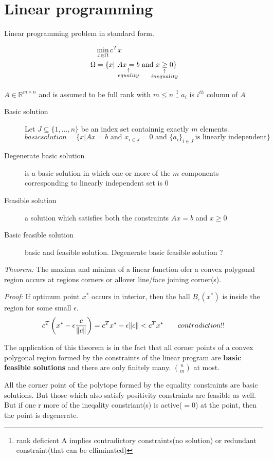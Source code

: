 \def \lpstd#1#2#3#4{
\begin{align*}
&\min\limits_{#1 \in #3} #2
\\
#3& = \{#1|~#4\}
\end{align*}
}
\section{Linear programming}
\begin{slide}
Linear programming problem in standard form.
\lpstd{x}{c^Tx}{\Omega}{\explain{Ax=b}{equality} ~\text{and}~ \explain{x\geq 0}{inequality}}
$A \in \mathbb{R}^{m\times n}$ and is assumed to be full rank with $m\leq n$
\footnote{rank deficient A implies contradictory constraints(no solution) or redundant constraint(that can be elliminated)}
$a_i$ is $i^{th}$ column of $A$
\begin{description}
	\item[Basic solution]  Let $J\subseteq \{1,\ldots,n\}$ be an index set containnig exactly $m$ elements. 
	$$basic solution = \{x | Ax=b \text{ and } x_{i\in J}=0 \text{ and } \{a_i\}_{i\in J}\ \text{is linearly independent}\}$$
	\item[Degenerate basic solution] is a basic solution in which one or more of the $m$ components corresponding to linearly independent set is $0$
	\item[Feasible solution] a solution which satisfies both the constraints $Ax=b$ and $x\geq 0$
	\item[Basic feasible solution] basic and feasible solution. Degenerate basic feasible solution ?
\end{description}
\end{slide}

\begin{slide}
	\emph{Theorem:} The maxima and minima of a linear function ofer a convex polygonal region occurs at regions corners or allover line/face joining corner(s).

	\emph{Proof:} If optimum point $x^*$ occurs in interior, then the ball $B_\epsilon(x^*)$ is inside the region for some small $\epsilon$. 
	$$c^T\left(x^*-\epsilon {c\over \|c\|}\right) = c^Tx^*-\epsilon\|c\|< c^Tx^*\qquad contradiction!!$$

	The application of this theorem is in the fact that all corner points of a convex polygonal region formed by the constraints of the linear program are \textbf{basic  feasible solutions} and there are only finitely many. $n \choose m$ at most.


All the corner point of the polytope formed by the equality constraints are basic solutions. But those which also satisfy positivity constraints are feasible as well. But if one r more of the ineqality constriant(s) is active($=0$) at the point, then the point is degenerate.
\end{slide}
